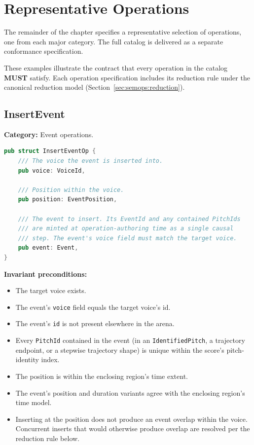\documentclass[11pt,letterpaper]{report}
\newcommand{\MUST}{\textbf{MUST}}
\begin{document}
\section{Representative Operations}
\label{sec:semops:examples}

The remainder of the chapter specifies a representative selection of
operations, one from each major category. The full catalog is
delivered as a separate conformance specification.

These examples illustrate the contract that every operation in the
catalog \MUST{} satisfy. Each operation specification includes its
reduction rule under the canonical reduction model
(Section~\ref{sec:semops:reduction}).

\subsection{InsertEvent}
\label{sec:semops:insertevent}

\textbf{Category:} Event operations.

\begin{lstlisting}[language=Rust]
pub struct InsertEventOp {
    /// The voice the event is inserted into.
    pub voice: VoiceId,

    /// Position within the voice.
    pub position: EventPosition,

    /// The event to insert. Its EventId and any contained PitchIds
    /// are minted at operation-authoring time as a single causal
    /// step. The event's voice field must match the target voice.
    pub event: Event,
}
\end{lstlisting}

\textbf{Invariant preconditions:}
\begin{itemize}
  \item The target voice exists.
  \item The event's \texttt{voice} field equals the target voice's id.
  \item The event's \texttt{id} is not present elsewhere in the arena.
  \item Every \texttt{PitchId} contained in the event (in an
    \texttt{IdentifiedPitch}, a trajectory endpoint, or a stepwise
    trajectory shape) is unique within the score's pitch-identity
    index.
  \item The position is within the enclosing region's time extent.
  \item The event's position and duration variants agree with the
    enclosing region's time model.
  \item Inserting at the position does not produce an event overlap
    within the voice. Concurrent inserts that would otherwise produce
    overlap are resolved per the reduction rule below.
\end{itemize}
\end{document}
